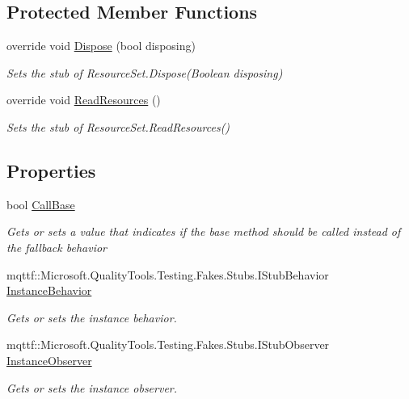 \subsection*{Protected Member Functions}
\begin{DoxyCompactItemize}
\item 
override void \hyperlink{class_system_1_1_resources_1_1_fakes_1_1_stub_resource_set_a29f6458442bc48ace86c4641e03d98d3}{Dispose} (bool disposing)
\begin{DoxyCompactList}\small\item\em Sets the stub of Resource\-Set.\-Dispose(\-Boolean disposing)\end{DoxyCompactList}\item 
override void \hyperlink{class_system_1_1_resources_1_1_fakes_1_1_stub_resource_set_a8c4eab12982b72c68c74c82375b88a02}{Read\-Resources} ()
\begin{DoxyCompactList}\small\item\em Sets the stub of Resource\-Set.\-Read\-Resources()\end{DoxyCompactList}\end{DoxyCompactItemize}
\subsection*{Properties}
\begin{DoxyCompactItemize}
\item 
bool \hyperlink{class_system_1_1_resources_1_1_fakes_1_1_stub_resource_set_a5fd979a55ae1aa653878711035ef4c09}{Call\-Base}
\begin{DoxyCompactList}\small\item\em Gets or sets a value that indicates if the base method should be called instead of the fallback behavior\end{DoxyCompactList}\item 
mqttf\-::\-Microsoft.\-Quality\-Tools.\-Testing.\-Fakes.\-Stubs.\-I\-Stub\-Behavior \hyperlink{class_system_1_1_resources_1_1_fakes_1_1_stub_resource_set_a2f197e05d8e99ec052001c1a2297ab16}{Instance\-Behavior}
\begin{DoxyCompactList}\small\item\em Gets or sets the instance behavior.\end{DoxyCompactList}\item 
mqttf\-::\-Microsoft.\-Quality\-Tools.\-Testing.\-Fakes.\-Stubs.\-I\-Stub\-Observer \hyperlink{class_system_1_1_resources_1_1_fakes_1_1_stub_resource_set_afe04a88ec6c90a61948a9429740e7a25}{Instance\-Observer}
\begin{DoxyCompactList}\small\item\em Gets or sets the instance observer.\end{DoxyCompactList}\end{DoxyCompactItemize}


